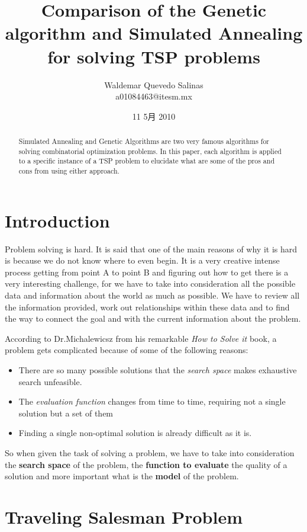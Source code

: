 \documentclass[journal]{IEEEtran}
\title{Comparison of the Genetic algorithm and Simulated Annealing for solving TSP problems}
\author{Waldemar Quevedo Salinas  \\a01084463@itesm.mx}
\date{11 5月 2010}
\begin{document}
\maketitle


\begin{abstract}
Simulated Annealing and Genetic Algorithms are two very famous
algorithms for solving combinatorial optimization problems. In this paper, 
each algorithm is applied to a specific instance of a TSP problem
to elucidate what are some of the pros and cons from using either approach.
\end{abstract}

\section{Introduction}
\label{sec-1}



Problem solving is hard. It is said that one of the main reasons of
why it is hard is because we do not know where to even
begin. It is a very creative intense process getting from point A to point B and
figuring out how to get there is a very interesting challenge, for we
have to take into consideration all the possible data and information 
about the world as much as possible. We have to review all the information
provided, work out relationships within these data and to find the way
to connect the goal and with the current information about the problem.

According to Dr.Michalewicsz from his remarkable \emph{How to Solve it} book,
a problem gets complicated because of some of the following reasons:

\begin{itemize}
\item There are so many  possible solutions that the \emph{search space} makes
  exhaustive search unfeasible.
\item The \emph{evaluation function} changes from time to time, requiring not a single
  solution but a set of them
\item Finding a single non-optimal solution is already difficult as it is.
\end{itemize}
So when given the task of solving a problem, we have to take into consideration
the \textbf{search space} of the problem, the \textbf{function to evaluate} 
the quality of a solution and more important what is the \textbf{model} of the
problem.

\section{Traveling Salesman Problem}
\label{sec-2}
\end{document}
